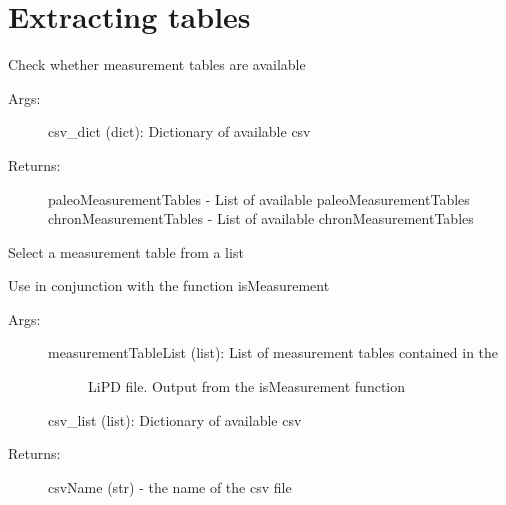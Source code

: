\documentclass[letterpaper,10pt,english]{sphinxmanual}
\begin{document}
\section{Extracting tables}
\label{\detokenize{LipdUtils:extracting-tables}}

\begin{fulllineitems}
\label{\detokenize{LipdUtils:pyleoclim.LipdUtils.isMeasurement}}
Check whether measurement tables are available
\begin{description}
\item[{Args:}] \leavevmode
csv\_dict (dict): Dictionary of available csv

\item[{Returns:}] \leavevmode
paleoMeasurementTables - List of available paleoMeasurementTables
chronMeasurementTables - List of available chronMeasurementTables

\end{description}

\end{fulllineitems}


\begin{fulllineitems}
\label{\detokenize{LipdUtils:pyleoclim.LipdUtils.whichMeasurement}}
Select a measurement table from a list

Use in conjunction with the function isMeasurement
\begin{description}
\item[{Args:}] \leavevmode\begin{description}
\item[{measurementTableList (list): List of measurement tables contained in the}] \leavevmode
LiPD file. Output from the isMeasurement function

\end{description}

csv\_list (list): Dictionary of available csv

\item[{Returns:}] \leavevmode
csvName (str) - the name of the csv file

\end{description}

\end{fulllineitems}
\end{document}
